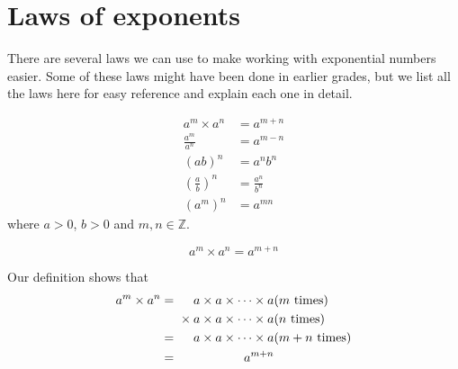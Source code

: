 





\section {Laws of exponents}
There are several laws we can use to make working with exponential numbers easier. 
Some of these laws might have been done in earlier grades, but we list all the laws here for easy reference and explain each one in detail. 


\begin{align*}
  a^{m} \times a^{n} &= a^{m+n} \\
  \frac{a^{m}}{a^{n}} &= a^{m-n} \\
  {(ab)}^{n} &= a^{n}b^{n} \\
  \left(\frac{a}{b}\right)^n &= \frac{a^n}{b^n} \\
  {({a}^{m})}^{n} &= a^{mn}
\end{align*}
where $a > 0$, $b > 0$ and $m, n \in \mathbb{Z}$.


\Identity
{
$${a}^{m}\times{a}^{n}={a}^{m+n}$$

Our definition shows that
\begin{eqnarray*}
	      {a}^{m}\times{a}^{n}& =& a\times a \times \cdots \times a\hfill & (\mbox{$m$ times})\hfill \\ 
	      & & \phantom{\rule{-0.166667em}{0ex}}\phantom{\rule{-0.166667em}{0ex}}\phantom{\rule{-0.166667em}{0ex}}\phantom{\rule{-0.166667em}{0ex}}\times a \times a\times \cdots \times a\hfill & (\mbox{$n$ times})\hfill \\ 
	      & =& a\times a \times \cdots \times a\hfill & (\mbox{$m+n$ times})\hfill \\ 
	      & =& {a}^{m+n}\hfill & 
\end{eqnarray*}
}


